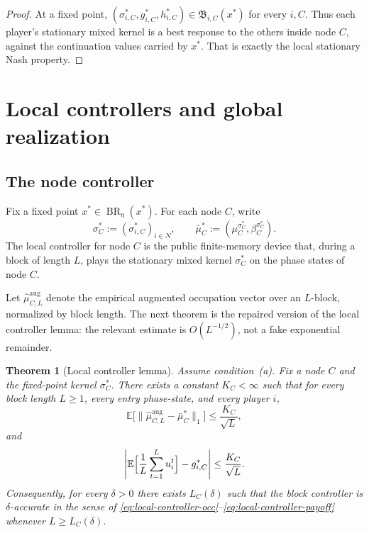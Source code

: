\documentclass[12pt]{article}
\newtheorem{theorem}{Theorem}[section]
\theoremstyle{definition}
\newcommand{\E}{\mathbb{E}}
\newcommand{\1}{\mathbf{1}}
\DeclareMathOperator{\BR}{BR}
\begin{document}
\begin{proof}
At a fixed point,
$(\sigma_{i,C}^*,g_{i,C}^*,h_{i,C}^*)\in\mathfrak B_{i,C}(x^*)$ for every $i,C$.
Thus each player's stationary mixed kernel is a best response to the others inside
node $C$, against the continuation values carried by $x^*$.  That is exactly the
local stationary Nash property.
\end{proof}

\section{Local controllers and global realization}
\label{sec:realization}

\subsection{The node controller}

Fix a fixed point $x^*\in\BR_\eta(x^*)$.  For each node $C$, write
\[
\sigma_C^*:=(\sigma_{i,C}^*)_{i\in N},
\qquad
\bar\mu_C^*:=(\mu_C^{\sigma_C^*},\beta_C^{\sigma_C^*}).
\]
The local controller for node $C$ is the public finite-memory device that, during a
block of length $L$, plays the stationary mixed kernel $\sigma_C^*$ on the phase
states of node $C$.

Let $\widehat\mu_{C,L}^{\mathrm{aug}}$ denote the empirical augmented occupation
vector over an $L$-block, normalized by block length.  The next theorem is the
repaired version of the local controller lemma: the relevant estimate is
$O(L^{-1/2})$, not a fake exponential remainder.

\begin{theorem}[Local controller lemma]
\label{thm:local-controller}
Assume condition~\textnormal{(a)}.  Fix a node $C$ and the fixed-point kernel $\sigma_C^*$.  There exists a constant
$K_C<\infty$ such that for every block length $L\ge 1$, every entry phase-state,
and every player $i$,
\begin{equation}
\label{eq:local-controller-occ}
\E\bigl[\|\widehat\mu_{C,L}^{\mathrm{aug}}-\bar\mu_C^*\|_1\bigr]
\le \frac{K_C}{\sqrt L},
\end{equation}
and
\begin{equation}
\label{eq:local-controller-payoff}
\left|
\E\Bigl[\frac1L\sum_{t=1}^L u_i^t\Bigr]-g_{i,C}^*
\right|
\le \frac{K_C}{\sqrt L}.
\end{equation}
Consequently, for every $\delta>0$ there exists $L_C(\delta)$ such that the block
controller is $\delta$-accurate in the sense of
\eqref{eq:local-controller-occ}--\eqref{eq:local-controller-payoff} whenever
$L\ge L_C(\delta)$.
\end{theorem}
\end{document}
